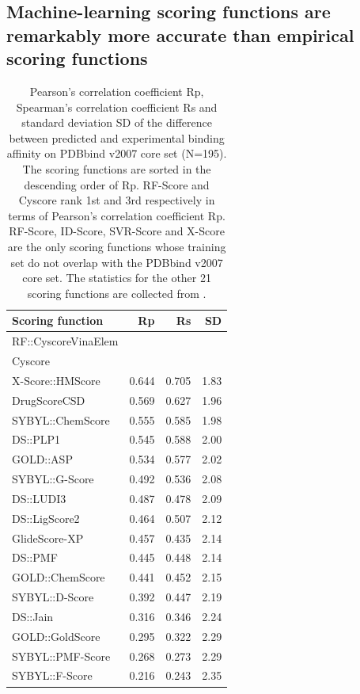 \documentclass[journal=jacsat,manuscript=article]{achemso}
\begin{document}
\subsection{Machine-learning scoring functions are remarkably more accurate than empirical scoring functions}

\begin{table}
\caption{Pearson's correlation coefficient Rp, Spearman's correlation coefficient Rs and standard deviation SD of the difference between predicted and experimental binding affinity on PDBbind v2007 core set (N=195). The scoring functions are sorted in the descending order of Rp. RF-Score and Cyscore rank 1st and 3rd respectively in terms of Pearson's correlation coefficient Rp. RF-Score, ID-Score, SVR-Score and X-Score are the only scoring functions whose training set do not overlap with the PDBbind v2007 core set. The statistics for the other 21 scoring functions are collected from \cite{1313,1362,564,1305,1295}.}
\label{tbl:tst195}
\begin{tabular}{lrrr}
\hline
Scoring function & Rp & Rs & SD\\
\hline
RF::CyscoreVinaElem & & & \\
Cyscore & & & \\
X-Score::HMScore & 0.644 & 0.705 & 1.83\\
DrugScoreCSD & 0.569 & 0.627 & 1.96\\
SYBYL::ChemScore & 0.555 & 0.585 & 1.98\\
DS::PLP1 & 0.545 & 0.588 & 2.00\\
GOLD::ASP & 0.534 & 0.577 & 2.02\\
SYBYL::G-Score & 0.492 & 0.536 & 2.08\\
DS::LUDI3 & 0.487 & 0.478 & 2.09\\
DS::LigScore2 & 0.464 & 0.507 & 2.12\\
GlideScore-XP & 0.457 & 0.435 & 2.14\\
DS::PMF & 0.445 & 0.448 & 2.14\\
GOLD::ChemScore & 0.441 & 0.452 & 2.15\\
SYBYL::D-Score & 0.392 & 0.447 & 2.19\\
DS::Jain & 0.316 & 0.346 & 2.24\\
GOLD::GoldScore & 0.295 & 0.322 & 2.29\\
SYBYL::PMF-Score & 0.268 & 0.273 & 2.29\\
SYBYL::F-Score & 0.216 & 0.243 & 2.35\\
\hline
\end{tabular}
\end{table}
\end{document}
